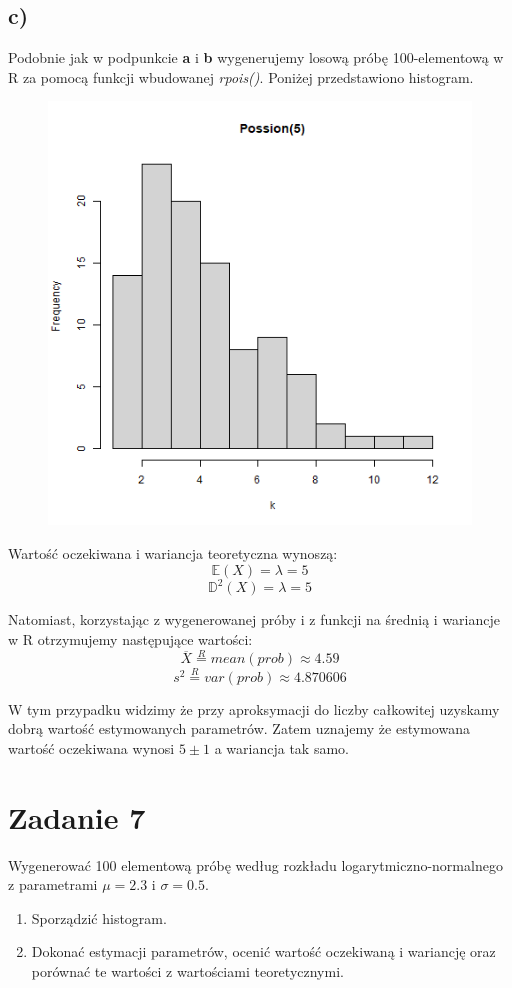 \documentclass{article}
\begin{document}
\subsection{c)}
Podobnie jak w podpunkcie \textbf{a} i \textbf{b} wygenerujemy losową próbę 100-elementową w R za pomocą funkcji wbudowanej \textit{rpois()}. Poniżej przedstawiono histogram.
\begin{figure}[h!]
\begin{center}
\includegraphics[height = 0.4\textheight, angle = 0]{"lab7zad6_c.png"}
\end{center}
\end{figure}

Wartość oczekiwana i wariancja teoretyczna wynoszą:
\[ \mathbb{E}(X) = \lambda = 5 \]
\[ \mathbb{D}^2(X) = \lambda = 5 \]

Natomiast, korzystając z wygenerowanej próby i z funkcji na średnią i wariancje w R otrzymujemy następujące wartości:
\[ \overline{X} \overset{R}{=} mean(prob) \approx 4.59 \]
\[ s^2 \overset{R}{=} var(prob) \approx 4.870606 \]

W tym przypadku widzimy że przy aproksymacji do liczby całkowitej uzyskamy dobrą wartość estymowanych parametrów. Zatem uznajemy że estymowana wartość oczekiwana wynosi $5 \pm 1$ a wariancja tak samo.

\newpage
\section{Zadanie 7}
Wygenerować 100 elementową próbę według rozkładu logarytmiczno-normalnego z parametrami $\mu = 2.3$ i $\sigma = 0.5$.
\begin{enumerate}[label = \alph*)]
\item Sporządzić histogram.
\item Dokonać estymacji parametrów, ocenić wartość oczekiwaną i wariancję oraz porównać te wartości z wartościami teoretycznymi.
\end{enumerate}
\end{document}
